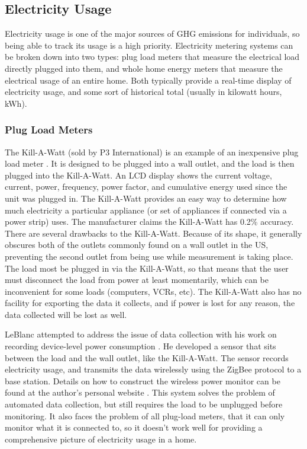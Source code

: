 \subsection{Electricity Usage}

Electricity usage is one of the major sources of GHG emissions for individuals, so being able to track its usage is a high priority. Electricity metering systems can be broken down into two types: plug load meters that measure the electrical load directly plugged into them, and whole home energy meters that measure the electrical usage of an entire home. Both typically provide a real-time display of electricity usage, and some sort of historical total (usually in kilowatt hours, kWh).

\subsubsection{Plug Load Meters}
\label{plug-load-meters}

The Kill-A-Watt (sold by P3 International) is an example of an inexpensive plug load meter \cite{kill-a-watt}. It is designed to be plugged into a wall outlet, and the load is then plugged into the Kill-A-Watt. An LCD display shows the current voltage, current, power, frequency, power factor, and cumulative energy used since the unit was plugged in. The Kill-A-Watt provides an easy way to determine how much electricity a particular appliance (or set of appliances if connected via a power strip) uses. The manufacturer claims the Kill-A-Watt has 0.2\% accuracy. There are several drawbacks to the Kill-A-Watt. Because of its shape, it generally obscures both of the outlets commonly found on a wall outlet in the US, preventing the second outlet from being use while measurement is taking place. The load most be plugged in via the Kill-A-Watt, so that means that the user must disconnect the load from power at least momentarily, which can be inconvenient for some loads (computers, VCRs, etc). The Kill-A-Watt also has no facility for exporting the data it collects, and if power is lost for any reason, the data collected will be lost as well.

LeBlanc attempted to address the issue of data collection with his work on recording device-level power consumption \cite{leblanc-2007}. He developed a sensor that sits between the load and the wall outlet, like the Kill-A-Watt. The sensor records electricity usage, and transmits the data wirelessly using the ZigBee protocol to a base station. Details on how to construct the wireless power monitor can be found at the author's personal website \cite{LeBlanc2008power-mon-howto}. This system solves the problem of automated data collection, but still requires the load to be unplugged before monitoring. It also faces the problem of all plug-load meters, that it can only monitor what it is connected to, so it doesn't work well for providing a comprehensive picture of electricity usage in a home.

